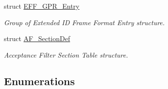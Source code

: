 \begin{DoxyCompactItemize}
struct \hyperlink{struct_e_f_f___g_p_r___entry}{\-E\-F\-F\-\_\-\-G\-P\-R\-\_\-\-Entry}
\begin{DoxyCompactList}\small\item\em \-Group of \-Extended \-I\-D \-Frame \-Format \-Entry structure. \end{DoxyCompactList}\item 
struct \hyperlink{struct_a_f___section_def}{\-A\-F\-\_\-\-Section\-Def}
\begin{DoxyCompactList}\small\item\em \-Acceptance \-Filter \-Section \-Table structure. \end{DoxyCompactList}\end{DoxyCompactItemize}
\subsection*{\-Enumerations}
